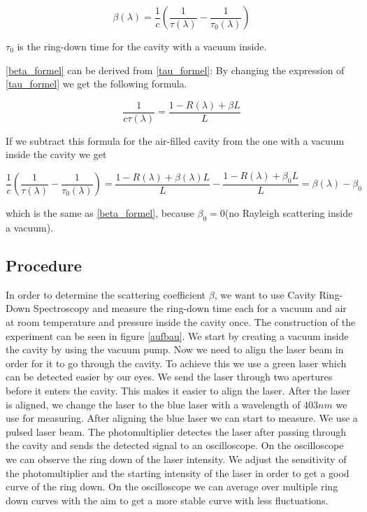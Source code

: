 \documentclass[10pt,a4paper]{article}
\begin{document}
\begin{equation}
\beta(\lambda) = \frac{1}{c} (\frac{1}{\tau(\lambda)} - \frac{1}{\tau_0(\lambda)})
\label{beta_formel}
\end{equation}

$\tau_0$ is the ring-down time for the cavity with a vacuum inside.

\ref{beta_formel} can be derived from \ref{tau_formel}: By changing the expression of \ref{tau_formel} we get the following formula.

\begin{equation}
\frac{1}{c \tau(\lambda)} = \frac{1-R(\lambda) + \beta L}{L}
\end{equation}



If we subtract this formula for the air-filled cavity from the one with a vacuum inside the cavity we get

\begin{equation}
\frac{1}{c}(\frac{1}{\tau(\lambda)} - \frac{1}{\tau_0(\lambda)}) = \frac{1 - R(\lambda) + \beta(\lambda) L}{L} - \frac{1 - R(\lambda) + \beta_0 L}{L} = \beta(\lambda) - \beta_0
\end{equation}  

which is the same as \ref{beta_formel}, because $\beta_0 = 0$(no Rayleigh scattering inside a vacuum).

\subsection{Procedure}

In order to determine the scattering coefficient $\beta$, we want to use Cavity Ring-Down Spectroscopy and measure the ring-down time each for a vacuum and air at room temperature and pressure inside the cavity once. The construction of the experiment can be seen in figure \ref{aufbau}.
We start by creating a vacuum inside the cavity by using the vacuum pump. Now we need to align the laser beam in order for it to go through the cavity. To achieve this we use a green laser which can be detected easier by our eyes. We send the laser through two apertures before it enters the cavity. This makes it easier to align the laser. After the laser is aligned, we change the laser to the blue laser with a wavelength of $403 nm$ we use for measuring. After aligning the blue laser we can start to measure. We use a pulsed laser beam. The photomultiplier detectes the laser after passing through the cavity and sends the detected signal to an oscilloscope. On the oscilloscope we can observe the ring down of the laser intensity. We adjust the sensitivity of the photomultiplier and the starting intensity of the laser in order to get a good curve of the ring down. On the oscilloscope we can average over multiple ring down curves with the aim to get a more stable curve with less fluctuations. 
\end{document}
